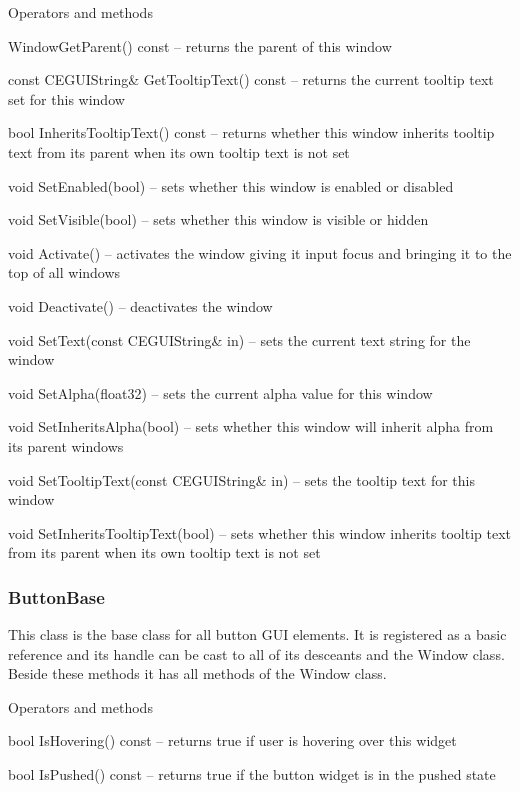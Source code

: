 \begin{titled-itemize}{Operators and methods}
  \item Window\@ GetParent() const -- returns the parent of this window
  \item const CEGUIString\& GetTooltipText() const -- returns the current tooltip text set for this window
  \item bool InheritsTooltipText() const -- returns whether this window inherits tooltip text from its parent when
 its own tooltip text is not set
  \item void SetEnabled(bool) -- sets whether this window is enabled or disabled
  \item void SetVisible(bool) -- sets whether this window is visible or hidden
  \item void Activate() -- activates the window giving it input focus and bringing it to the top of
 all windows
  \item void Deactivate() -- deactivates the window
  \item void SetText(const CEGUIString\& in) -- sets the current text string for the window
  \item void SetAlpha(float32) -- sets the current alpha value for this window
  \item void SetInheritsAlpha(bool) -- sets whether this window will inherit alpha from its parent windows
  \item void SetTooltipText(const CEGUIString\& in) -- sets the tooltip text for this window
  \item void SetInheritsTooltipText(bool) -- sets whether this window inherits tooltip text from its parent when its
 own tooltip text is not set
\end{titled-itemize}

\subsubsection{ButtonBase}

This class is the base class for all button GUI elements. It is registered as a basic reference and its handle can be cast to all of its desceants and the Window class. Beside these methods it has all methods of the Window class.

\begin{titled-itemize}{Operators and methods}
  \item bool IsHovering() const -- returns true if user is hovering over this widget
  \item bool IsPushed() const -- returns true if the button widget is in the pushed state
\end{titled-itemize}


